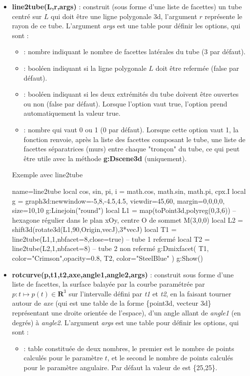 \begin{itemize}
    \item \textbf{line2tube(L,r,args)} : construit (sous forme d'une liste de facettes) un tube centré sur $L$ qui doit être une ligne polygonale 3d, l'argument $r$ représente le rayon de ce tube. L'argument \emph{args} est une table pour définir les options, qui sont :
    \begin{itemize}
        \item {} : nombre indiquant le nombre de facettes latérales du tube (3 par défaut).
        \item {} : booléen indiquant si la ligne polygonale $L$ doit être refermée (false par défaut).
        \item {} : booléen indiquant si les deux extrémités du tube doivent être ouvertes ou non (false par défaut). Lorsque l'option  vaut true, l'option  prend automatiquement la valeur true.
        \item {} : nombre qui vaut 0 ou 1 (0 par défaut). Lorsque cette option vaut 1, la fonction renvoie, après la liste des facettes composant le tube, une liste de facettes séparatrices (murs) entre chaque "tronçon" du tube, ce qui peut être utile avec la méthode \textbf{g:Dscene3d} (uniquement).
    \end{itemize}
    
\begin{demo}{Exemple avec line2tube}
\begin{luadraw}{name=line2tube}
local cos, sin, pi, i = math.cos, math.sin, math.pi, cpx.I
local g = graph3d:new{window={-5,8,-4.5,4.5}, viewdir={45,60}, margin={0,0,0,0}, size={10,10}}
g:Linejoin("round")
local L1 = map(toPoint3d,polyreg(0,3,6)) -- hexagone régulier dans le plan xOy, centre O de sommet M(3,0,0)
local L2 = shift3d(rotate3d(L1,90,{Origin,vecJ}),3*vecJ)
local T1 = line2tube(L1,1,{nbfacet=8,close=true}) -- tube 1 refermé
local T2 = line2tube(L2,1,{nbfacet=8})  -- tube 2 non refermé
g:Dmixfacet( T1, {color="Crimson",opacity=0.8}, T2, {color="SteelBlue"} )
g:Show()
\end{luadraw}
\end{demo}

    \item \textbf{rotcurve(p,t1,t2,axe,angle1,angle2,args)} : construit sous forme d'une liste de facettes, la surface balayée par la courbe paramétrée par $p\colon t\mapsto p(t)\in \mathbf R^3$ sur l'intervalle défini par \emph{t1} et \emph{t2}, en la faisant tourner autour de \emph{axe} (qui est une table de la forme \{point3d, vecteur 3d\} représentant une droite orientée de l'espace), d'un angle allant de \emph{angle1} (en degrés) à \emph{angle2}. L'argument \emph{args} est une table pour définir les options, qui sont :
    \begin{itemize}
        \item {} : table constituée de deux nombres, le premier est le nombre de points calculés pour le paramètre $t$, et le second le nombre de points calculés pour le paramètre angulaire. Par défaut la valeur de  est \{25,25\}.


\end{itemize}
\end{itemize}
